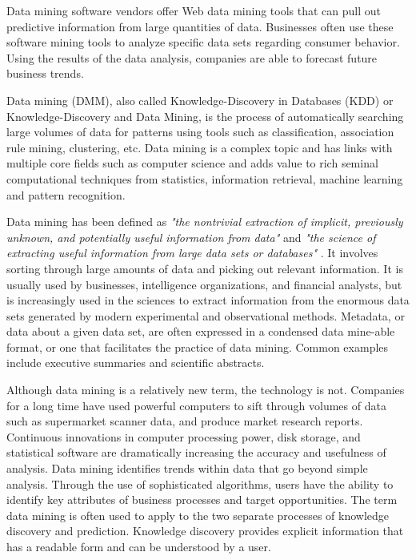 Data mining software vendors offer Web data mining tools that can pull out predictive information from large quantities of data. Businesses often use these software mining tools to analyze specific data sets regarding consumer behavior. Using the results of the data analysis, companies are able to forecast future business trends.



Data mining (DMM), also called Knowledge-Discovery in Databases (KDD) or Knowledge-Discovery and Data Mining, is the process of automatically searching large volumes of data for patterns using tools such as classification, association rule mining, clustering, etc. Data mining is a complex topic and has links with multiple core fields such as computer science and adds value to rich seminal computational techniques from statistics, information retrieval, machine learning and pattern recognition.




Data mining has been defined as \emph{"the nontrivial extraction of implicit, previously unknown, and potentially useful information from data"} and \emph{"the science of extracting useful information from large data sets or databases" }. It involves sorting through large amounts of data and picking out relevant information. It is usually used by businesses, intelligence organizations, and financial analysts, but is increasingly used in the sciences to extract information from the enormous data sets generated by modern experimental and observational methods. Metadata, or data about a given data set, are often expressed in a condensed data mine-able format, or one that facilitates the practice of data mining. Common examples include executive summaries and scientific abstracts.




Although data mining is a relatively new term, the technology is not. Companies for a long time have used powerful computers to sift through volumes of data such as supermarket scanner data, and produce market research reports. Continuous innovations in computer processing power, disk storage, and statistical software are dramatically increasing the accuracy and usefulness of analysis. Data mining identifies trends within data that go beyond simple analysis. Through the use of sophisticated algorithms, users have the ability to identify key attributes of business processes and target opportunities. The term data mining is often used to apply to the two separate processes of knowledge discovery and prediction. Knowledge discovery provides explicit information that has a readable form and can be understood by a user.

